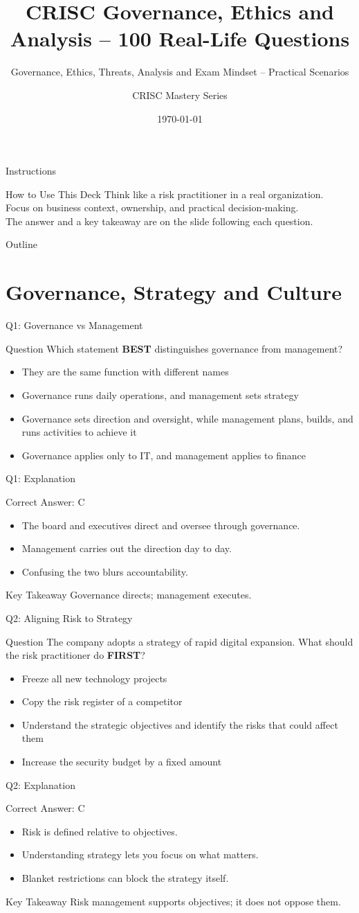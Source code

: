 \documentclass[aspectratio=169]{beamer}
\title{CRISC Governance, Ethics and Analysis -- 100 Real-Life Questions}
\subtitle{Governance, Ethics, Threats, Analysis and Exam Mindset -- Practical Scenarios}
\author{CRISC Mastery Series}
\date{\today}
\newcommand{\hq}[7]{%
	\begin{frame}{Q#1: #2}
		\begin{block}{Question}
			#3
		\end{block}
		\begin{itemize}
			#4
		\end{itemize}
	\end{frame}
	\begin{frame}{Q#1: Explanation}
		\begin{block}{Correct Answer: #5}
			\begin{itemize}
				#6
			\end{itemize}
		\end{block}
		\begin{alertblock}{Key Takeaway}
			#7
		\end{alertblock}
	\end{frame}
}
\begin{document}
	
	\begin{frame}
		\titlepage
	\end{frame}
	
	\begin{frame}{Instructions}
		\begin{alertblock}{How to Use This Deck}
			Think like a risk practitioner in a real organization.\\
			Focus on business context, ownership, and practical decision-making.\\
			The answer and a key takeaway are on the slide following each question.
		\end{alertblock}
	\end{frame}
	
	\begin{frame}{Outline}
		\tableofcontents
	\end{frame}
	
	\section{Governance, Strategy and Culture}
	
	\hq{1}{Governance vs Management}
	{Which statement \textbf{BEST} distinguishes governance from management?}
	{\item[\textbf{(A)}] They are the same function with different names
		\item[\textbf{(B)}] Governance runs daily operations, and management sets strategy
		\item[\textbf{(C)}] Governance sets direction and oversight, while management plans, builds, and runs activities to achieve it
		\item[\textbf{(D)}] Governance applies only to IT, and management applies to finance}
	{C}
	{\item The board and executives direct and oversee through governance.
		\item Management carries out the direction day to day.
		\item Confusing the two blurs accountability.}
	{Governance directs; management executes.}
	
	\hq{2}{Aligning Risk to Strategy}
	{The company adopts a strategy of rapid digital expansion. What should the risk practitioner do \textbf{FIRST}?}
	{\item[\textbf{(A)}] Freeze all new technology projects
		\item[\textbf{(B)}] Copy the risk register of a competitor
		\item[\textbf{(C)}] Understand the strategic objectives and identify the risks that could affect them
		\item[\textbf{(D)}] Increase the security budget by a fixed amount}
	{C}
	{\item Risk is defined relative to objectives.
		\item Understanding strategy lets you focus on what matters.
		\item Blanket restrictions can block the strategy itself.}
	{Risk management supports objectives; it does not oppose them.}
	
\end{document}
